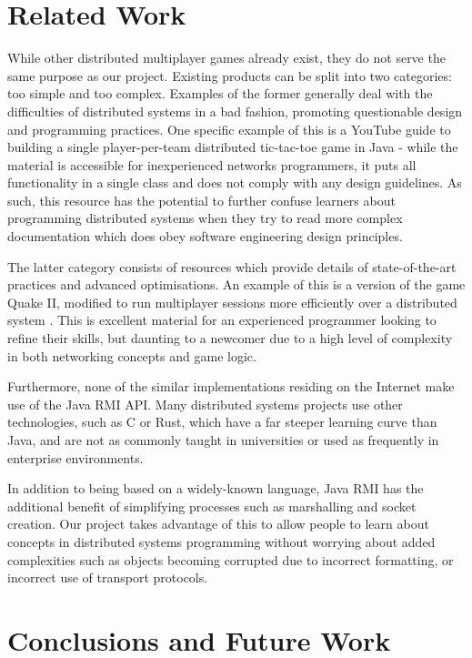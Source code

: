 \documentclass[conference]{IEEEtran}
\begin{document}
\section{Related Work}
While other distributed multiplayer games already exist, they do not serve the same
purpose as our project. Existing products can be split into two categories: too simple and too complex. Examples of the former generally deal with the difficulties of distributed systems in a bad fashion, promoting questionable design and programming practices. One specific example of this is a YouTube guide to building a single player-per-team distributed tic-tac-toe game in Java \cite{MrWayFarOutYoutube15} - while the material is accessible for inexperienced networks programmers, it puts all functionality in a single class and does not comply with any design guidelines. As such, this resource has the potential to further confuse learners about programming distributed systems when they try to read more complex documentation which does obey software engineering design principles.

The latter category consists of resources which provide details of state-of-the-art practices and advanced optimisations. An example of this is a version of the game Quake II, modified to run multiplayer sessions more efficiently over a distributed system \cite{DBLP:conf/nsdi/BharambePS06}. This is excellent material for an experienced programmer looking to refine their skills, but daunting to a newcomer due to a high level of complexity in both networking concepts and game logic.

Furthermore, none of the similar implementations residing on the Internet make use of the Java RMI API. Many distributed systems projects use other technologies, such as C or Rust, which have a far steeper learning curve than Java, and are not as commonly taught in universities or used as frequently in enterprise environments.

In addition to being based on a widely-known language, Java RMI has the additional benefit of simplifying processes such as marshalling and socket creation. Our project takes advantage of this to allow people to learn about concepts in distributed systems programming without worrying about added complexities such as objects becoming corrupted due to incorrect formatting, or incorrect use of transport protocols.

\section{Conclusions and Future Work}
\end{document}
